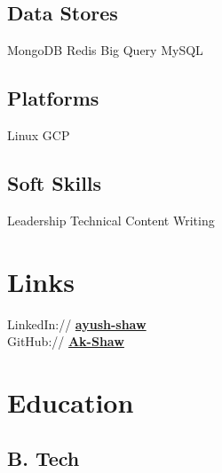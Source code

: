 \documentclass[]{deedy-resume-openfont}
\begin{document}
\begin{minipage}[t]{0.33\textwidth}
\subsection{Data Stores}
MongoDB \textbullet{} Redis \textbullet{} Big Query \textbullet{} MySQL
\sectionsep

\subsection{Platforms}
Linux \textbullet{} GCP 
\sectionsep

\subsection{Soft Skills}
Leadership \textbullet{} Technical Content Writing 
\sectionsep


\section{Links} 
LinkedIn://  \href{https://www.linkedin.com/in/ayush-shaw}{\bf ayush-shaw} \\
GitHub://  \href{https://github.com/Ak-Shaw}{\bf Ak-Shaw} \\


\section{Education} 


\subsection{B. Tech} 
\sectionsep


\end{minipage}
\end{document}
